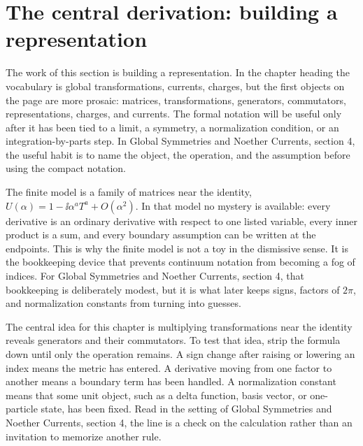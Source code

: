 \section{The central derivation: building a representation}













The work of this section is building a representation.  In the chapter heading the vocabulary is global transformations, currents, charges, but the first objects on the page are more prosaic: matrices, transformations, generators, commutators, representations, charges, and currents.  The formal notation will be useful only after it has been tied to a limit, a symmetry, a normalization condition, or an integration-by-parts step.  In Global Symmetries and Noether Currents, section 4, the useful habit is to name the object, the operation, and the assumption before using the compact notation.

The finite model is a family of matrices near the identity, \(U(\alpha)=1-\ii\alpha^aT^a+O(\alpha^2)\).  In that model no mystery is available: every derivative is an ordinary derivative with respect to one listed variable, every inner product is a sum, and every boundary assumption can be written at the endpoints.  This is why the finite model is not a toy in the dismissive sense.  It is the bookkeeping device that prevents continuum notation from becoming a fog of indices.  For Global Symmetries and Noether Currents, section 4, that bookkeeping is deliberately modest, but it is what later keeps signs, factors of \(2\pi\), and normalization constants from turning into guesses.

The central idea for this chapter is multiplying transformations near the identity reveals generators and their commutators.  To test that idea, strip the formula down until only the operation remains.  A sign change after raising or lowering an index means the metric has entered.  A derivative moving from one factor to another means a boundary term has been handled.  A normalization constant means that some unit object, such as a delta function, basis vector, or one-particle state, has been fixed.  Read in the setting of Global Symmetries and Noether Currents, section 4, the line is a check on the calculation rather than an invitation to memorize another rule.

